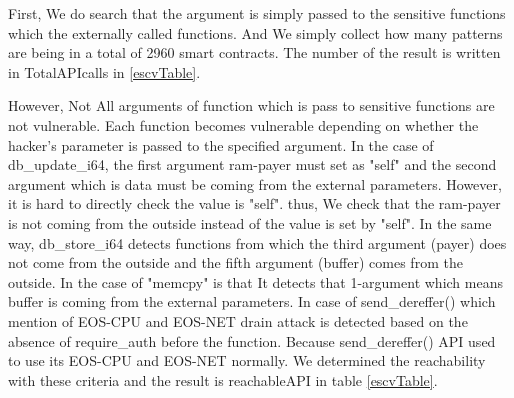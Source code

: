 First, We do search that the argument is simply passed to the sensitive functions which the externally called functions. And We simply collect how many patterns are being in a total of 2960 smart contracts. The number of the result is written in TotalAPIcalls in \autoref{escvTable}.

However, Not All arguments of function which is pass to sensitive functions are not vulnerable. Each function becomes vulnerable depending on whether the hacker's parameter is passed to the specified argument. In the case of db\_update\_i64, the first argument ram-payer must set as "self" and the second argument which is data must be coming from the external parameters. However, it is hard to directly check the value is "self". thus, We check that the ram-payer is not coming from the outside instead of the value is set by "self".
In the same way, db\_store\_i64 detects functions from which the third argument (payer) does not come from the outside and the fifth argument (buffer) comes from the outside.
In the case of "memcpy" is that It detects that 1-argument which means buffer is coming from the external parameters.
In case of send\_dereffer() which mention of EOS-CPU and EOS-NET drain attack is detected based on the absence of require\_auth before the function. Because send\_dereffer() API used to use its EOS-CPU and EOS-NET normally.
We determined the reachability with these criteria and the result is reachableAPI in table \autoref{escvTable}.




